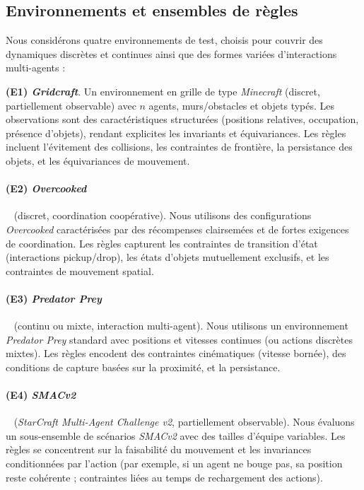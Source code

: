 \documentclass[final]{jfsma}
\theoremstyle{plain}
\theoremstyle{definition}
\theoremstyle{remark}
\begin{document}
\subsection{Environnements et ensembles de règles}
\label{sec:envs}

Nous considérons quatre environnements de test, choisis pour couvrir des dynamiques discrètes et continues ainsi que des formes variées d'interactions multi-agents :

\hspace{0.1cm}\textbf{(E1) \emph{Gridcraft}}\hyperref[fn:github-gridcraft]{\footnotemark[2]}.
Un environnement en grille de type \emph{Minecraft} (discret, partiellement observable) avec $n$ agents, murs/obstacles et objets typés.
Les observations sont des caractéristiques structurées (positions relatives, occupation, présence d'objets),
rendant explicites les invariants et équivariances.
Les règles\hyperref[fn:github]{\footnotemark[1]} incluent l'évitement des collisions, les contraintes de frontière, la persistance des objets, et les équivariances de mouvement.


\paragraph{(E2) \emph{Overcooked}}~\cite{Micah2020overcooked} (discret, coordination coopérative).
Nous utilisons des configurations \emph{Overcooked} caractérisées par des récompenses clairsemées et de fortes exigences de coordination.
Les règles\hyperref[fn:github]{\footnotemark[1]} capturent les contraintes de transition d'état (interactions pickup/drop), les états d'objets mutuellement exclusifs,
et les contraintes de mouvement spatial.

\paragraph{(E3) \emph{Predator Prey}}~\cite{lowe2017multi} (continu ou mixte, interaction multi-agent).
Nous utilisons un environnement \emph{Predator Prey} standard avec positions et vitesses continues (ou actions discrètes mixtes).
Les règles\hyperref[fn:github]{\footnotemark[1]} encodent des contraintes cinématiques (vitesse bornée), des conditions de capture basées sur la proximité, et la persistance.

\paragraph{(E4) \emph{SMACv2}}~\cite{Ellis2023smacv2} (\emph{StarCraft Multi-Agent Challenge v2}, partiellement observable).
Nous évaluons un sous-ensemble de scénarios \emph{SMACv2} avec des tailles d'équipe variables.
Les règles\hyperref[fn:github]{\footnotemark[1]} se concentrent sur la faisabilité du mouvement et les invariances conditionnées par l'action
(par exemple, si un agent ne bouge pas, sa position reste cohérente ; contraintes liées au temps de rechargement des actions).
\end{document}
